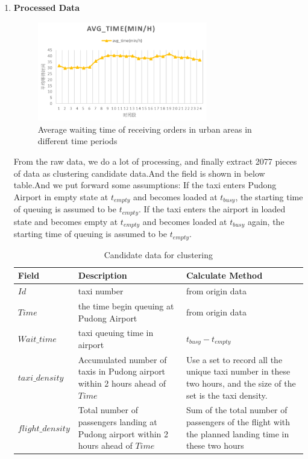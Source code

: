 \begin{enumerate}
\item \textbf{Processed Data} \\

\begin{figure}[H]
\centering
\includegraphics[width=0.7\textwidth]{figures/Q2_4.png}
\caption{Average waiting time of receiving orders in urban areas in different time periods}
\label{fig:label}
\end{figure}
From the raw data, we do a lot of processing, and finally extract 2077 pieces of data as clustering candidate data.And the field is shown in below table.And we put forward some assumptions: If the taxi enters Pudong Airport in empty state at $t_{empty}$ and becomes loaded at $t_{busy}$, the starting time of queuing is assumed to be $t_{empty}$. If the taxi enters the airport in loaded state and becomes empty at $t_{empty}$ and becomes loaded at  $t_{busy}$ again, the starting time of queuing is assumed to be $t_{empty}$.
\begin{table}[H]
\centering
\caption{Candidate data for clustering}
\begin{tabular}{|l|p{5cm}|p{7cm}|}
\hline
\textbf{Field} & \textbf{Description} & \textbf{Calculate Method} \\ \hline
$Id$ & taxi number & from origin data \\ \hline
$Time$ &  the time begin queuing at Pudong Airport & from origin data  \\\hline
$Wait\_time$ & taxi queuing time in airport & $t_{busy} - t_{empty}$  \\ \hline
$taxi\_density$ & Accumulated number of taxis in Pudong airport within 2 hours ahead of $Time$ & Use a set to record all the unique taxi number in these two hours, and the size of the set is the taxi density.\\ \hline
$flight\_density$ & Total number of passengers landing at Pudong airport within 2 hours ahead of $Time$ & Sum of the total number of passengers of the flight with the planned landing time in these two hours\\ \hline
\end{tabular}
\end{table}
\end{enumerate}




